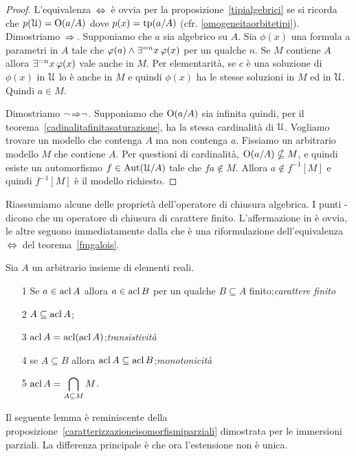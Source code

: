 \begin{proof} 
L'equivalenza $\,\Leftrightarrow\,$ \`e ovvia per la proposizione~\ref{tipialgebrici} se si ricorda che $p(\EuScript U)=\textrm{O}(a/A)$ dove $p(x)=\textrm{tp}(a/A)$ (cfr. \ref{omogeneitaorbitetipi}). Dimostriamo $\,\Rightarrow\,$. Supponiamo che $a$ sia algebrico su $A$. Sia $\phi(x)$ una formula a parametri in $A$ tale che $\varphi(a)\wedge\exists^{= n}x\,\varphi(x)$ per un qualche $n$. Se $M$ contiene $A$ allora $\exists^{=n}x\,\varphi(x)$ vale anche in $M$. Per elementarit\`a, se $c$ \`e una soluzione di $\phi(x)$ in $\EuScript U$ lo \`e anche in $M$ e quindi $\phi(x)$ ha le stesse soluzioni in $M$ ed in $\EuScript U$. Quindi $a\in M$.

Dimostriamo $\neg$$\,{\Rightarrow}\neg$. Supponiamo che $\textrm{O}(a/A)$ sia infinita quindi, per il teorema~\ref{cadinalitafinitasaturazione}, ha la stessa cardinalit\`a di $\EuScript U$. Vogliamo trovare un modello che contenga $A$ ma non contenga $a$. Fissiamo un arbitrario modello $M$ che contiene $A$. Per questioni di cardinalit\`a, $\textrm{O}(a/A)\nsubseteq M$, e quindi esiste un automorfismo $f\in\textrm{Aut}(\EuScript U/A)$ tale che $fa\notin M$. Allora $a\notin f^{-1}[M]$ e quindi $f^{-1}[M]$ \`e il modello richiesto.
\end{proof}

Riassumiamo alcune delle propriet\`a dell'operatore di chiusura algebrica. I punti - dicono che un operatore di chiusura di carattere finito. L'affermazione in  \`e ovvia, le altre seguono immediatamente dalla  che \`e una riformulazione dell'equivalenza $\,\Leftrightarrow\,$ del teorema~\ref{fmgalois}.

\begin{corollary}\label{fmacl123} Sia $A$ un arbitrario insieme di elementi reali.
\begin{itemize}
\item[1]  Se $a\in\mathop{\rm acl} A$ allora $a\in\mathop{\rm acl} B$ per un qualche $B\subseteq A$ finito;\hfill\emph{carattere finito}
\item[2]  $A\subseteq \mathop{\rm acl} A$;
\item[3]  $\mathop{\rm acl} A=\mathop{\rm acl}(\mathop{\rm acl} A)$;\hfill\emph{transistivit\`a}
\item[4]  se $A\subseteq B$ allora $\mathop{\rm acl} A\subseteq \mathop{\rm acl} B$;\hfill\emph{monotonicit\`a}
\item[5]  $\displaystyle\mathop{\rm acl} A=\bigcap_{A\subseteq M}M$.\QED
\end{itemize} 
\end{corollary}

Il seguente lemma \`e reminiscente della proposizione~\ref{caratterizzazioneisomorfismiparziali} dimostrata per le immersioni parziali. La differenza principale \`e che ora l'estensione non \`e unica.

